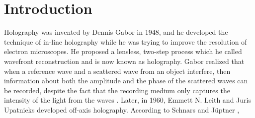 %
%

\chapter{Introduction} \label{chap:Intro}

Holography was invented by Dennis Gabor in 1948, and he developed the technique
of in-line holography while he was trying to improve the resolution of
electron microscopes. He proposed a lensless, two-step process which he called
wavefront reconstruction and is now known as holography.
Gabor realized that when a reference wave and a scattered wave from an object
interfere, then information about both the amplitude and the phase of the
scattered waves can be recorded, despite the fact that the recording medium
only captures the intensity of the light from the waves \cite{Goodman}.
Later, in 1960, Emmett N. Leith and Juris Upatnieks developed
off-axis holography. According to Schnars and J\"{u}ptner
\cite{schnars_digital_2002},

